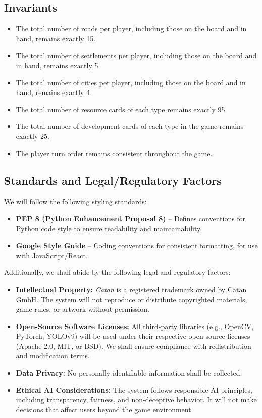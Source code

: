 \documentclass{article}
\begin{document}
\subsection{Invariants}\label{subsec:invariants}
\begin{itemize}
    \item The total number of roads per player, including those on the board and in hand, remains exactly 15.
    \item The total number of settlements per player, including those on the board and in hand, remains exactly 5.
    \item The total number of cities per player, including those on the board and in hand, remains exactly 4.
    \item The total number of resource cards of each type remains exactly 95.
    \item The total number of development cards of each type in the game remains exactly 25.
    \item The player turn order remains consistent throughout the game.
\end{itemize}


\subsection{Standards and Legal/Regulatory Factors}
We will follow the following styling standards:
\begin{itemize}
    \item \textbf{PEP 8 (Python Enhancement Proposal 8)} – Defines conventions for Python code style to ensure readability and maintainability.
    \item \textbf{Google Style Guide} – Coding conventions for consistent formatting, for use with JavaScript/React.
\end{itemize}

Additionally, we shall abide by the following legal and regulatory factors:
\begin{itemize}
    \item \textbf{Intellectual Property:}
    \emph{Catan} is a registered trademark owned by Catan GmbH. The system will not reproduce or distribute copyrighted materials, game rules, or artwork without permission.

    \item \textbf{Open-Source Software Licenses:}
    All third-party libraries (e.g., OpenCV, PyTorch, YOLOv9) will be used under their respective open-source licenses (Apache 2.0, MIT, or BSD). We shall ensure compliance with redistribution and modification terms.

    \item \textbf{Data Privacy:}
    No personally identifiable information shall be collected.

    \item \textbf{Ethical AI Considerations:}
    The system follows responsible AI principles, including transparency, fairness, and non-deceptive behavior. It will not make decisions that affect users beyond the game environment.
\end{itemize}
\end{document}
